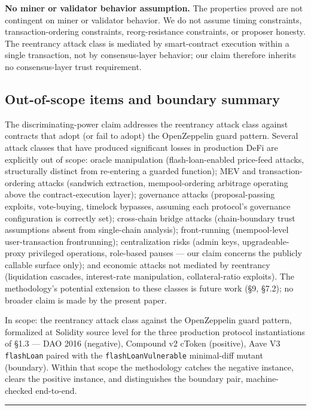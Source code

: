 \textbf{No miner or validator behavior assumption.} The properties
proved are not contingent on miner or validator behavior. We do not
assume timing constraints, transaction-ordering constraints,
reorg-resistance constraints, or proposer honesty. The reentrancy attack
class is mediated by smart-contract execution within a single
transaction, not by consensus-layer behavior; our claim therefore
inherits no consensus-layer trust requirement.

\subsection{Out-of-scope items and boundary
summary}\label{out-of-scope-items-and-boundary-summary}

The discriminating-power claim addresses the reentrancy attack class
against contracts that adopt (or fail to adopt) the OpenZeppelin guard
pattern. Several attack classes that have produced significant losses in
production DeFi are explicitly out of scope: oracle manipulation
(flash-loan-enabled price-feed attacks, structurally distinct from
re-entering a guarded function); MEV and transaction-ordering attacks
(sandwich extraction, mempool-ordering arbitrage operating above the
contract-execution layer); governance attacks (proposal-passing
exploits, vote-buying, timelock bypasses, assuming each protocol's
governance configuration is correctly set); cross-chain bridge attacks
(chain-boundary trust assumptions absent from single-chain analysis);
front-running (mempool-level user-transaction frontrunning);
centralization risks (admin keys, upgradeable-proxy privileged
operations, role-based pauses --- our claim concerns the publicly
callable surface only); and economic attacks not mediated by reentrancy
(liquidation cascades, interest-rate manipulation, collateral-ratio
exploits). The methodology's potential extension to these classes is
future work (§9, §7.2); no broader claim is made by the present paper.

In scope: the reentrancy attack class against the OpenZeppelin guard
pattern, formalized at Solidity source level for the three production
protocol instantiations of §1.3 --- DAO 2016 (negative), Compound v2
cToken (positive), Aave V3 \texttt{flashLoan} paired with the
\texttt{flashLoanVulnerable} minimal-diff mutant (boundary). Within that
scope the methodology catches the negative instance, clears the positive
instance, and distinguishes the boundary pair, machine-checked
end-to-end.

\begin{center}\rule{0.5\linewidth}{0.5pt}\end{center}

